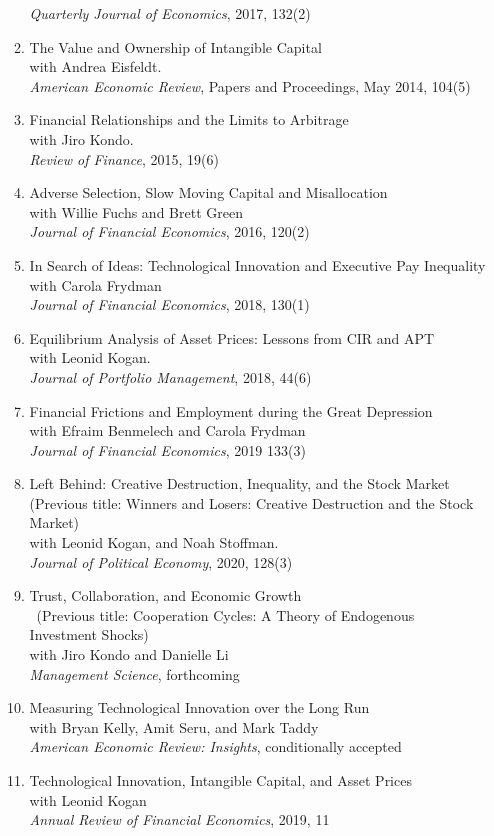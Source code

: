 \documentclass[11pt,letterpaper,serif,overlapped]{res}
\begin{document}
\begin{resume}
\begin{itemize}
\begin{enumerate}
\emph{Quarterly Journal of Economics}, 2017, 132(2)
\item The Value and Ownership of Intangible Capital\\ with Andrea Eisfeldt. \\
\emph{American Economic Review}, Papers and Proceedings, May 2014, 104(5)
\item Financial Relationships and the Limits to Arbitrage\\ with Jiro Kondo.\\
\emph{Review of Finance}, 2015, 19(6)
\item Adverse Selection, Slow Moving Capital and Misallocation\\ with Willie Fuchs and Brett Green\\
\emph{Journal of Financial Economics}, 2016, 120(2)
\item In Search of Ideas: Technological Innovation and Executive Pay Inequality\\ with Carola Frydman\\
\emph{Journal of Financial Economics}, 2018, 130(1)
\item Equilibrium Analysis of Asset Prices: Lessons from CIR and APT\\with Leonid Kogan. \\
\emph{Journal of Portfolio Management}, 2018, 44(6)
\item Financial Frictions and Employment during the Great Depression\\ with Efraim Benmelech and Carola Frydman\\\emph{Journal of Financial Economics}, 2019 133(3)
\item Left Behind: Creative Destruction, Inequality, and the Stock Market \\(Previous title:  Winners and Losers: Creative Destruction and the Stock Market)\\ with Leonid Kogan, and Noah Stoffman.\\\emph{Journal of Political Economy}, 2020, 128(3)
\item Trust, Collaboration, and Economic Growth \\\ (Previous title: Cooperation Cycles: A Theory of Endogenous Investment Shocks)\\ with Jiro Kondo and Danielle Li\\\emph{Management Science}, forthcoming
\item Measuring Technological Innovation over the Long Run\\ with Bryan Kelly, Amit Seru, and Mark Taddy\\\emph{American Economic Review: Insights}, conditionally accepted
\item Technological Innovation, Intangible Capital, and Asset Prices\\ with Leonid Kogan\\
\emph{Annual Review of Financial Economics}, 2019, 11


\end{enumerate}
\end{itemize}
\end{resume}
\end{document}
